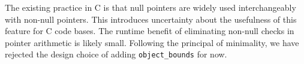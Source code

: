 The existing practice in C is that null pointers are widely used interchangeably
with non-null pointers.  This introduces uncertainty about the usefulness of this 
feature for C code bases.  The runtime benefit of eliminating non-null
checks in pointer arithmetic is likely small.  Following the principal of 
minimality, we have rejected the design choice of adding \texttt{object\_bounds} 
for now. 

